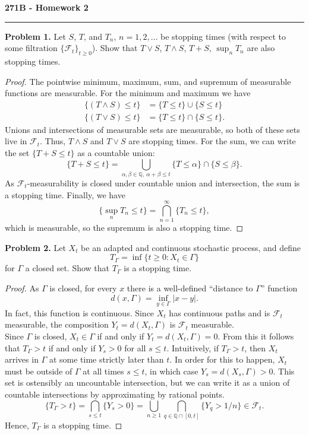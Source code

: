 \documentclass[11pt,letterpaper]{report}
\newcommand{\mcal}[1]{\mathcal{#1}}
\newcommand{\rationals}{\mathbb{Q}}
\begin{document}
\begin{center}
{\bf \Large 271B - Homework 2}
\vspace{0.2cm}
\hrule
\end{center}

\noindent\textbf{Problem 1. }
Let $S$, $T$, and $T_n$, $n = 1, 2, \ldots$ be stopping times (with respect to some filtration $\{\mcal{F}_t\}_{t\geq 0}$). Show that $T\lor S$, $T\land S$, $T+S$, $\sup_n T_n$ are also stopping times.
\begin{proof}
	The pointwise minimum, maximum, sum, and supremum of measurable functions are measurable. For the minimum and maximum we have
	\begin{align*}
		\{(T\land S) \leq t\} &= \{T\leq t\} \cup \{S\leq t\}\\
		\{(T\lor S) \leq t\} &= \{T\leq t\} \cap \{S\leq t\}.
	\end{align*}
	Unions and intersections of measurable sets are measurable, so both of these sets live in $\mcal{F}_t$. Thus, $T\land S$ and $T\lor S$ are stopping times. For the sum, we can write the set $\{T+S \leq t\}$ as a countable union:
	\[
	\{T+S \leq t\} = \bigcup_{\alpha, \beta \in \rationals,\ \alpha+\beta \leq t}\{T\leq \alpha\} \cap \{S\leq \beta\}.
	\]
	As $\mcal{F}_t$-measurability is closed under countable union and intersection, the sum is a stopping time. Finally, we have
	\[
	\{\sup_n T_n \leq t\} = \bigcap_{n=1}^\infty \{T_n \leq t\},
	\]
	which is measurable, so the supremum is also a stopping time.
\end{proof}

\noindent\textbf{Problem 2. }
Let $X_t$ be an adapted and continuous stochastic process, and define
\[
T_\Gamma = \inf\{t\geq 0: X_t\in \Gamma\}
\]
for $\Gamma$ a closed set. Show that $T_\Gamma$ is a stopping time.
\begin{proof}
	As $\Gamma$ is closed, for every $x$ there is a well-defined ``distance to $\Gamma$'' function
	\[
	d(x, \Gamma) = \inf_{y\in \Gamma}|x-y|.
	\]
	In fact, this function is continuous. Since $X_t$ has continuous paths and is $\mcal{F}_t$ measurable, the composition $Y_t = d(X_t, \Gamma)$ is $\mcal{F}_t$ measurable.\\

	\noindent Since $\Gamma$ is closed, $X_t\in \Gamma$ if and only if $Y_t = d(X_t, \Gamma) = 0$. From this it follows that $T_\Gamma>t$ if and only if $Y_s > 0$ for all $s\leq t$. Intuitively, if $T_\Gamma>t$, then $X_t$ arrives in $\Gamma$ at some time strictly later than $t$. In order for this to happen, $X_t$ must be outside of $\Gamma$ at all times $s\leq t$, in which case $Y_s = d(X_s, \Gamma)>0$. This set is ostensibly an uncountable intersection, but we can write it as a union of countable intersections by approximating by rational points.
	\[
	\{T_\Gamma > t\} = \bigcap_{s\leq t}\{Y_s>0\} = \bigcup_{n\geq 1}\bigcap_{q\in \rationals \cap [0, t]}\{Y_q  >1/n\} \in \mcal{F}_t.
	\]
	Hence, $T_\Gamma$ is a stopping time.
\end{proof}
\end{document}
